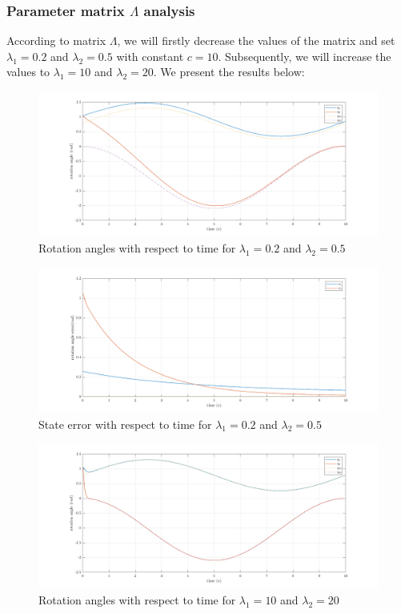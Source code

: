 \documentclass[a4paper]{article}
\begin{document}
\subsubsection{Parameter matrix $\Lambda$ analysis}
According to matrix $\Lambda$, we will firstly decrease the values of the matrix and set $\lambda_1 = 0.2$ 
and $\lambda_2 = 0.5$ with constant $c=10$. Subsequently, we will increase the values to $\lambda_1 = 10$ and $\lambda_2 = 20$. 
We present the results below:
\begin{figure}[H]
    \centering
    \includegraphics[width=15cm]{fig/sim2/ldecrease/qldecrease.png}
    \caption{Rotation angles with respect to time for $\lambda_1=0.2$ and $\lambda_2=0.5$}
\end{figure}
\begin{figure}[H]
    \centering
    \includegraphics[width=15cm]{fig/sim2/ldecrease/eldecrease.png}
    \caption{State error with respect to time for $\lambda_1=0.2$ and $\lambda_2=0.5$}
\end{figure}
\begin{figure}[H]
    \centering
    \includegraphics[width=15cm]{fig/sim2/lincrease/qlincrease.png}
    \caption{Rotation angles with respect to time for $\lambda_1=10$ and $\lambda_2=20$}
\end{figure}
\end{document}

